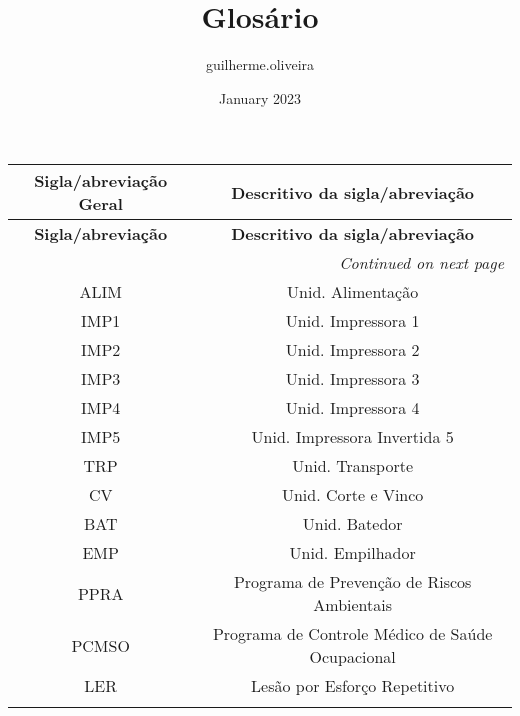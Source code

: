 \documentclass{article}
\title{Glosário}
\author{guilherme.oliveira }
\date{January 2023}
\begin{document}
\begin{longtable}{@{}c c@{}}
\textbf{Sigla/abreviação Geral} & \textbf{Descritivo da sigla/abreviação} \\
\midrule
\endfirsthead
\textbf{Sigla/abreviação} & \textbf{Descritivo da sigla/abreviação} \\
\midrule
\endhead
\midrule
\multicolumn{2}{r}{\textit{Continued on next page}}
\endfoot
\midrule
\endlastfoot

\gls{alm} & Alarme \\
\addlinespace[0.2cm]

\gls{ALIM} & Unid. Alimentação  \\
\addlinespace[0.2cm]

\gls{IMP1} & Unid. Impressora 1 \\
\addlinespace[0.2cm]

\gls{IMP2} & Unid. Impressora 2 \\
\addlinespace[0.2cm]

\gls{IMP3} & Unid. Impressora 3 \\
\addlinespace[0.2cm]

\gls{IMP4} & Unid. Impressora 4 \\
\addlinespace[0.2cm]

\gls{IMP5} & Unid. Impressora Invertida 5 \\
\addlinespace[0.2cm]

\gls{TRP} & Unid. Transporte \\
\addlinespace[0.2cm]

\gls{CV} & Unid. Corte e Vinco \\
\addlinespace[0.2cm]

\gls{BAT} & Unid. Batedor \\
\addlinespace[0.2cm]

\gls{EMP} & Unid. Empilhador \\
\addlinespace[0.2cm]

\gls{PPRA} & Programa de Prevenção de Riscos Ambientais \\
\addlinespace[0.2cm]

\gls{PCMSO} & Programa de Controle Médico de Saúde Ocupacional \\
\addlinespace[0.2cm]

\gls{LER} & Lesão por Esforço Repetitivo \\
\addlinespace[0.2cm]

\end{longtable}
\end{document}
